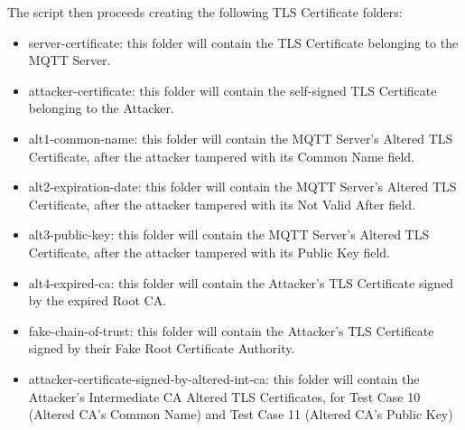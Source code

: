 \documentclass[binding=0.6cm,noexaminfo]{sapthesis}
\begin{document}
The script then proceeds creating the following TLS Certificate folders:
\begin{itemize}
	\item server-certificate: this folder will contain the TLS Certificate belonging to the MQTT Server.
	\item attacker-certificate: this folder will contain the self-signed TLS Certificate belonging to the Attacker.
	\item alt1-common-name: this folder will contain the MQTT Server’s Altered TLS Certificate, after the attacker tampered with its Common Name field.
	\item alt2-expiration-date: this folder will contain the MQTT Server’s Altered TLS Certificate, after the attacker tampered with its Not Valid After field.
	\item alt3-public-key: this folder will contain the MQTT Server’s Altered TLS Certificate, after the attacker tampered with its Public Key field.
	\item alt4-expired-ca: this folder will contain the Attacker’s TLS Certificate signed by the expired Root CA.
	\item fake-chain-of-trust: this folder will contain the Attacker’s TLS Certificate signed by their Fake Root Certificate Authority.
	\item attacker-certificate-signed-by-altered-int-ca: this folder will contain the Attacker's Intermediate CA Altered TLS Certificates, for Test Case 10 (Altered CA's Common Name) and Test Case 11 (Altered CA's Public Key)
\end{itemize}
\end{document}
